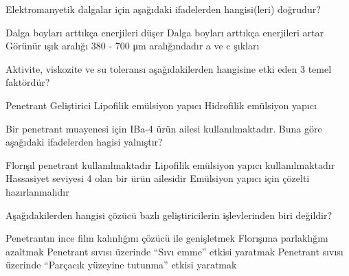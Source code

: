 \begin{question}[subtitle=]
  Elektromanyetik dalgalar için aşağıdaki ifadelerden hangisi(leri) doğrudur?
	\begin{tasks}
          \task Dalga boyları arttıkça enerjileri düşer \correct
          \task Dalga boyları arttıkça enerjileri artar
          \task Görünür ışık aralığı 380 - 700 \si{\micro\m} aralığındadır
          \task a ve c şıkları
	\end{tasks}
\end{question}
\begin{solution}
	\correct
\end{solution}

\begin{question}[subtitle=]
  Aktivite, viskozite ve su toleransı aşağıdakilerden hangisine etki eden 3 temel faktördür?
	\begin{tasks}
          \task Penetrant
          \task Geliştirici
          \task Lipofilik emülsiyon yapıcı \correct
          \task Hidrofilik emülsiyon yapıcı
	\end{tasks}
\end{question}
\begin{solution}
	\correct
\end{solution}

\begin{question}[subtitle=]
  Bir penetrant muayenesi için IBa-4 ürün ailesi kullanılmaktadır. Buna göre
  aşağıdaki ifadelerden hagisi yalnıştır?
	\begin{tasks}
          \task Florışıl penetrant kullanılmaktadır
          \task Lipofilik emülsiyon yapıcı kullanılmaktadır
          \task Hassasiyet seviyesi 4 olan bir ürün ailesidir
          \task Emülsiyon yapıcı için çözelti hazırlanmalıdır \correct
	\end{tasks}
\end{question}
\begin{solution}
	\correct
\end{solution}

\begin{question}[subtitle=]
  Aşağıdakilerden hangisi çözücü bazlı geliştiricilerin işlevlerinden biri değildir?
	\begin{tasks}
          \task Penetrantın ince film kalınlığını çözücü ile genişletmek
          \task Florışıma parlaklığını azaltmak \correct
          \task Penetrant sıvısı üzerinde ``Sıvı emme'' etkisi yaratmak 
          \task Penetrant sıvısı üzerinde ``Parçacık yüzeyine tutunma'' etkisi yaratmak
	\end{tasks}
\end{question}
\begin{solution}
	\correct
\end{solution}

